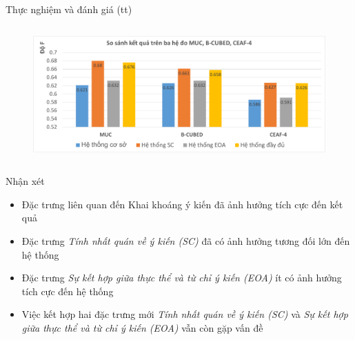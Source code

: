 \documentclass[9pt,xcolor=table,hyperref=unicode]{beamer}
\begin{document}
		\begin{frame}[t]{Thực nghiệm và đánh giá (tt)}								
			\begin{columns}[t]
				\begin{column}{\textwidth}
					\begin{figure}[H] 			
						\centering					
						\includegraphics[scale=0.38]{charts/chart_comparison.pdf}									
					\end{figure} 				
				\end{column}
			\end{columns}
			\begin{columns}[t]
				\begin{column}{\textwidth}
					\begin{block}{Nhận xét}
						\footnotesize		
						\begin{itemize}
							\item{Đặc trưng liên quan đến Khai khoáng ý kiến đã ảnh hưởng tích cực đến kết quả}
							\item{Đặc trưng \textit{Tính nhất quán về ý kiến (SC)} đã có ảnh hưởng tương đối lớn đến hệ thống}
							\item{Đặc trưng \textit{Sự kết hợp giữa thực thể và từ chỉ ý kiến (EOA)} ít có ảnh hưởng tích cực đến hệ thống}
							\item{Việc kết hợp hai đặc trưng mới \textit{Tính nhất quán về ý kiến (SC)} và \textit{Sự kết hợp giữa thực thể và từ chỉ ý kiến (EOA)} vẫn còn gặp vấn đề}
						\end{itemize}			
					\end{block}
				\end{column}				
			\end{columns}						
		\end{frame}	
\end{document}
